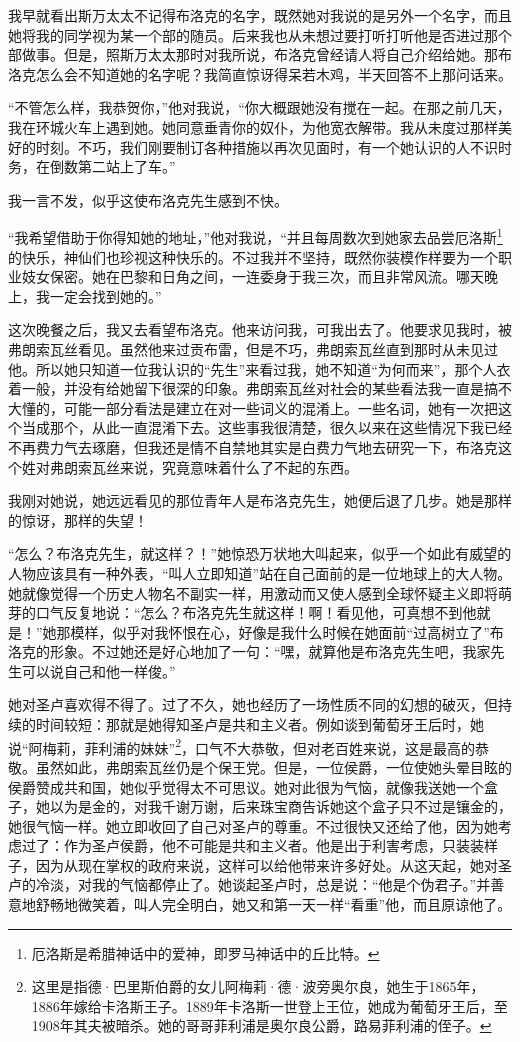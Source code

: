 \par 我早就看出斯万太太不记得布洛克的名字，既然她对我说的是另外一个名字，而且她将我的同学视为某一个部的随员。后来我也从未想过要打听打听他是否进过那个部做事。但是，照斯万太太那时对我所说，布洛克曾经请人将自己介绍给她。那布洛克怎么会不知道她的名字呢？我简直惊讶得呆若木鸡，半天回答不上那问话来。
\par “不管怎么样，我恭贺你，”他对我说，“你大概跟她没有搅在一起。在那之前几天，我在环城火车上遇到她。她同意垂青你的奴仆，为他宽衣解带。我从未度过那样美好的时刻。不巧，我们刚要制订各种措施以再次见面时，有一个她认识的人不识时务，在倒数第二站上了车。”
\par 我一言不发，似乎这使布洛克先生感到不快。
\par “我希望借助于你得知她的地址，”他对我说，“并且每周数次到她家去品尝厄洛斯\footnote{厄洛斯是希腊神话中的爱神，即罗马神话中的丘比特。}的快乐，神仙们也珍视这种快乐的。不过我并不坚持，既然你装模作样要为一个职业妓女保密。她在巴黎和日角之间，一连委身于我三次，而且非常风流。哪天晚上，我一定会找到她的。”
\par 这次晚餐之后，我又去看望布洛克。他来访问我，可我出去了。他要求见我时，被弗朗索瓦丝看见。虽然他来过贡布雷，但是不巧，弗朗索瓦丝直到那时从未见过他。所以她只知道一位我认识的“先生”来看过我，她不知道“为何而来”，那个人衣着一般，并没有给她留下很深的印象。弗朗索瓦丝对社会的某些看法我一直是搞不大懂的，可能一部分看法是建立在对一些词义的混淆上。一些名词，她有一次把这个当成那个，从此一直混淆下去。这些事我很清楚，很久以来在这些情况下我已经不再费力气去琢磨，但我还是情不自禁地其实是白费力气地去研究一下，布洛克这个姓对弗朗索瓦丝来说，究竟意味着什么了不起的东西。
\par 我刚对她说，她远远看见的那位青年人是布洛克先生，她便后退了几步。她是那样的惊讶，那样的失望！
\par “怎么？布洛克先生，就这样？！”她惊恐万状地大叫起来，似乎一个如此有威望的人物应该具有一种外表，“叫人立即知道”站在自己面前的是一位地球上的大人物。她就像觉得一个历史人物名不副实一样，用激动而又使人感到全球怀疑主义即将萌芽的口气反复地说：“怎么？布洛克先生就这样！啊！看见他，可真想不到他就是！”她那模样，似乎对我怀恨在心，好像是我什么时候在她面前“过高树立了”布洛克的形象。不过她还是好心地加了一句：“嘿，就算他是布洛克先生吧，我家先生可以说自己和他一样俊。”
\par 她对圣卢喜欢得不得了。过了不久，她也经历了一场性质不同的幻想的破灭，但持续的时间较短：那就是她得知圣卢是共和主义者。例如谈到葡萄牙王后时，她说“阿梅莉，菲利浦的妹妹”\footnote{这里是指德·巴里斯伯爵的女儿阿梅莉·德·波旁奥尔良，她生于1865年，1886年嫁给卡洛斯王子。1889年卡洛斯一世登上王位，她成为葡萄牙王后，至1908年其夫被暗杀。她的哥哥菲利浦是奥尔良公爵，路易菲利浦的侄子。}，口气不大恭敬，但对老百姓来说，这是最高的恭敬。虽然如此，弗朗索瓦丝仍是个保王党。但是，一位侯爵，一位使她头晕目眩的侯爵赞成共和国，她似乎觉得太不可思议。她对此很为气恼，就像我送她一个盒子，她以为是金的，对我千谢万谢，后来珠宝商告诉她这个盒子只不过是镶金的，她很气恼一样。她立即收回了自己对圣卢的尊重。不过很快又还给了他，因为她考虑过了：作为圣卢侯爵，他不可能是共和主义者。他是出于利害考虑，只装装样子，因为从现在掌权的政府来说，这样可以给他带来许多好处。从这天起，她对圣卢的冷淡，对我的气恼都停止了。她谈起圣卢时，总是说：“他是个伪君子。”并善意地舒畅地微笑着，叫人完全明白，她又和第一天一样“看重”他，而且原谅他了。
